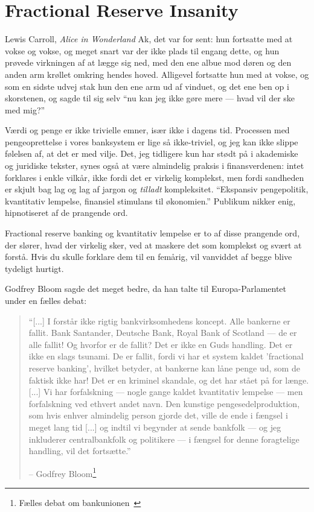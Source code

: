 \chapter{Fractional Reserve Insanity}
\label{les:13}

\begin{chapquote}{Lewis Carroll, \textit{Alice in Wonderland}}
Ak, det var for sent: hun fortsatte med at vokse og vokse, og meget snart var der
ikke plads til engang dette, og hun prøvede virkningen af at lægge sig ned, med den ene albue
mod døren og den anden arm krøllet omkring hendes hoved. Alligevel fortsatte hun med at vokse,
og som en sidste udvej stak hun den ene arm ud af vinduet, og det ene ben op i skorstenen, og sagde til sig selv
\enquote{nu kan jeg ikke gøre mere — hvad vil der ske med mig?}
\end{chapquote}

Værdi og penge er ikke trivielle emner, især ikke i dagens tid. Processen med pengeoprettelse
i vores banksystem er lige så ikke-triviel, og jeg kan ikke slippe følelsen af, at det er med vilje.
Det, jeg tidligere kun har stødt på i akademiske og juridiske tekster, synes også at være
almindelig praksis i finansverdenen: intet forklares i enkle vilkår, ikke fordi det er virkelig komplekst,
men fordi sandheden er skjult bag lag og lag af jargon og \textit{tilladt} kompleksitet.
\enquote{Ekspansiv pengepolitik, kvantitativ lempelse, finansiel stimulans til økonomien.} Publikum nikker enig,
hipnotiseret af de prangende ord.

Fractional reserve banking og kvantitativ lempelse er to af disse prangende ord,
der slører, hvad der virkelig sker, ved at maskere det som komplekst og svært at forstå.
Hvis du skulle forklare dem til en femårig, vil vanviddet af begge blive tydeligt hurtigt.

Godfrey Bloom sagde det meget bedre, da han talte til Europa-Parlamentet under en fælles debat:

\begin{quotation}\begin{samepage}
\enquote{[...] I forstår ikke rigtig bankvirksomhedens koncept. Alle
bankerne er fallit. Bank Santander, Deutsche Bank, Royal Bank of
Scotland --- de er alle fallit! Og hvorfor er de fallit? Det er ikke en
Guds handling. Det er ikke en slags tsunami. De er fallit, fordi vi
har et system kaldet 'fractional reserve banking', hvilket betyder, at
bankerne kan låne penge ud, som de faktisk ikke har! Det er en kriminel
skandale, og det har stået på for længe. [...]
Vi har forfalskning --- nogle gange kaldet kvantitativ lempelse ---
men forfalskning ved ethvert andet navn. Den kunstige
pengesedelproduktion, som hvis enhver almindelig person gjorde det, ville de ende i
fængsel i meget lang tid [...] og indtil vi begynder at sende
bankfolk --- og jeg inkluderer centralbankfolk og politikere --- i
fængsel for denne foragtelige handling, vil det fortsætte.}
\begin{flushright} -- Godfrey Bloom\footnote{Fælles debat om
bankunionen~\cite{godfrey-bloom}}
\end{flushright}\end{samepage}\end{quotation}

